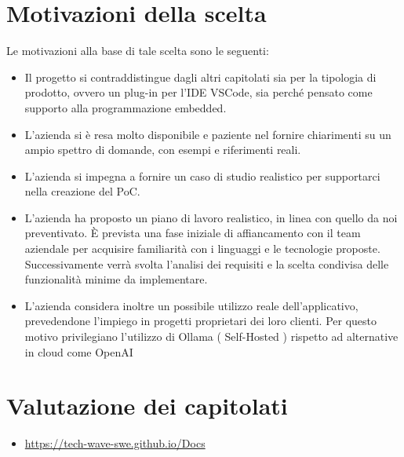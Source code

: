 \documentclass{article}
\begin{document}
    \section*{Motivazioni della scelta}
    {Le motivazioni alla base di tale scelta sono le seguenti:}
    \begin{itemize}
        \item {Il progetto si contraddistingue dagli altri capitolati sia per la tipologia di prodotto, ovvero un plug-in per l'IDE VSCode, sia perché pensato come supporto alla programmazione embedded.}
        \item{L'azienda si è resa molto disponibile e paziente nel fornire chiarimenti su un ampio spettro di domande, con esempi e riferimenti reali.}
        \item{L'azienda si impegna a fornire un caso di studio realistico per supportarci nella creazione del PoC.}
        \item{L'azienda ha proposto un piano di lavoro realistico, in linea con quello da noi preventivato. È prevista una fase iniziale di affiancamento con il team aziendale per acquisire familiarità con i linguaggi e le tecnologie proposte. Successivamente verrà svolta l'analisi dei requisiti e la scelta condivisa delle funzionalità minime da implementare.}
        \item{L'azienda considera inoltre un possibile utilizzo reale dell'applicativo, prevedendone l'impiego in progetti proprietari dei loro clienti. Per questo motivo privilegiano l'utilizzo di Ollama ( Self-Hosted ) rispetto ad alternative in cloud come OpenAI}
    \end{itemize}

    \section*{Valutazione dei capitolati}
    \begin{itemize}
        \item \href{https://tech-wave-swe.github.io/Docs}{https://tech-wave-swe.github.io/Docs}
    \end{itemize}
\end{document}
